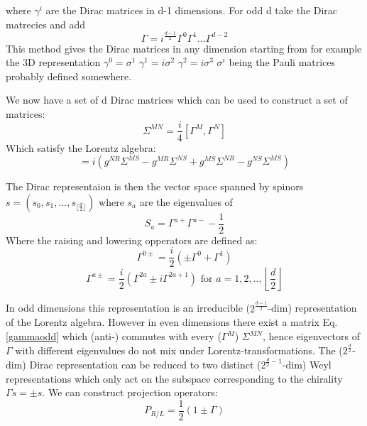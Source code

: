 \documentclass{article}
\begin{document}
where $\gamma^i$ are the Dirac matrices in d-1 dimensions. For odd d take the Dirac matrecies and add 
\begin{equation}
    \Gamma=i^{\frac{d-1}{2}}\Gamma^0\Gamma^1...\Gamma^{d-2}
    \label{gammaodd}
\end{equation}
This method gives the Dirac matrices in any dimension starting from for example the 3D representation  $\gamma^0=\sigma^1$ $\gamma^1=i\sigma^2$ $\gamma^2=i\sigma^3$ $\sigma^i$ being the  Pauli matrices probably defined somewhere.

We now have a set of d Dirac matrices which can be used to construct a set of matrices:
\begin{equation}
    \Sigma^{MN}=\frac{i}{4}[\Gamma^M,\Gamma^N]
\end{equation}
Which satisfy the Lorentz algebra:
\begin{equation}
    [\Sigma^{MN},\Sigma^{RS}]=i(g^{NR}\Sigma^{MS}-g^{MR}\Sigma^{NS}+g^{MS}\Sigma^{NR}-g^{NS}\Sigma^{MS})
\end{equation}

The Dirac representaion is then the vector space spanned by spinors $s=(s_0,s_1,...,s_{\lfloor\frac{d}{2}\rfloor})$ where $s_a$ are the eigenvalues  of
\begin{equation}
    S_a=\Gamma^{a+}\Gamma^{a-}-\frac{1}{2}
\end{equation}
Where the raising and lowering opperators are defined as:
\begin{equation}
    \Gamma^{0\pm}=\frac{i}{2}(\pm\Gamma^{0}+\Gamma^{1})
\end{equation}
\begin{equation*}
    \Gamma^{a\pm}=\frac{i}{2}(\Gamma^{2a}\pm i\Gamma^{2a+1}) \text{ for } a=1,2,..,\left\lfloor\frac{d}{2}\right\rfloor
\end{equation*}



In odd dimensions this representation is an irreducible ($2^{\frac{d-1}{2}}$-dim) representation of the Lorentz algebra. However in even dimensions there exist a matrix Eq.\ref{gammaodd} which (anti-) commutes with every ($\Gamma^M$) $\Sigma^{MN}$, hence eigenvectors of $\Gamma$ with different eigenvalues do not mix under Lorentz-transformations. The ($2^{\frac{d}{2}}$-dim) Dirac representation can be reduced to two distinct ($2^{\frac{d}{2}-1}$-dim) Weyl representations which only act on the subspace corresponding to the chirality  $\Gamma s=\pm s$. 
We can construct projection operators:
\begin{equation}
   P_{R/L}=\frac{1}{2}(1\pm \Gamma)
\end{equation}
\end{document}
